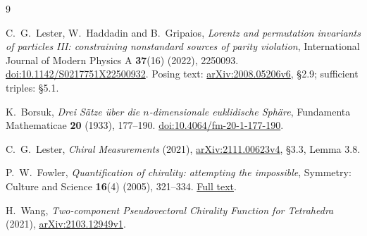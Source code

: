 \documentclass[11pt,a4paper]{article}
\begin{document}
\begin{thebibliography}{9}
\raggedright
{}
C.~G.~Lester, W.~Haddadin and B.~Gripaios,
\emph{Lorentz and permutation invariants of particles III:
constraining nonstandard sources of parity violation},
International Journal of Modern Physics A \textbf{37}(16) (2022), 2250093.
\href{https://doi.org/10.1142/S0217751X22500932}{doi:10.1142/S0217751X22500932}.
Posing text: \href{https://arxiv.org/abs/2008.05206v6}{arXiv:2008.05206v6},
\S2.9; sufficient triples: \S5.1.

K.~Borsuk, \emph{Drei S\"atze \"uber die $n$-dimensionale euklidische
Sph\"are}, Fundamenta Mathematicae \textbf{20} (1933), 177--190.
\href{https://doi.org/10.4064/fm-20-1-177-190}{doi:10.4064/fm-20-1-177-190}.

C.~G.~Lester, \emph{Chiral Measurements} (2021),
\href{https://arxiv.org/abs/2111.00623v4}{arXiv:2111.00623v4},
\S3.3, Lemma 3.8.

P.~W.~Fowler, \emph{Quantification of chirality: attempting the impossible},
Symmetry: Culture and Science \textbf{16}(4) (2005), 321--334.
\href{https://journal-scs.symmetry.hu/wp-content/uploads/2014/01/fowler-05-4.pdf}{Full text}.

H.~Wang, \emph{Two-component Pseudovectoral Chirality Function for
Tetrahedra} (2021),
\href{https://arxiv.org/abs/2103.12949v1}{arXiv:2103.12949v1}.
\end{thebibliography}
\end{document}

